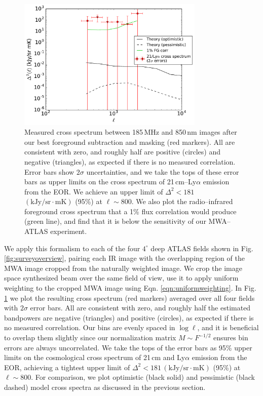 \documentclass[numberedappendix]{emulateapj}
\begin{document}
\begin{figure}[h]
\centering
\includegraphics[width=3.5in]{mwa_atlas_xspec_with_2Dsimtheory_and_2sigma_errors_6bins.pdf}
\caption[Measured cross spectrum between 185\,MHz and 850\,nm images after our best foreground subtraction and masking.]{Measured cross spectrum between 185\,MHz and 850\,nm images after our best foreground subtraction and masking (red markers). All are consistent with zero, and roughly half are positive (circles) and negative (triangles), as expected if there is no measured correlation. Error bars show $2\sigma$ uncertainties, and we take the tops of these error bars as upper limits on the cross spectrum of 21\,cm--Ly$\alpha$ emission from the EOR. We achieve an upper limit of $\Delta^2<181$\,$(\text{kJy/sr}\cdot \text{mK})$ (95\%) at $\ell\sim800$. We also plot the radio--infrared foreground cross spectrum that a 1\% flux correlation would produce (green line), and find that it is below the sensitivity of our MWA--ATLAS experiment.}
\label{fig:resxspec}
\end{figure}

We apply this formalism to each of the four $4^\circ$ deep ATLAS fields shown in Fig. \ref{fig:surveyoverview}, pairing each IR image with the overlapping region of the MWA image cropped from the naturally weighted image. We crop the image space synthesized beam over the same field of view, use it to apply uniform weighting to the cropped MWA image using Eqn. \ref{eqn:uniformweighting}. In Fig. \ref{fig:resxspec} we plot the resulting cross spectrum (red markers) averaged over all four fields with $2\sigma$ error bars. All are consistent with zero, and roughly half the estimated bandpowers are negative (triangles) and positive (circles), as expected if there is no measured correlation. Our bins are evenly spaced in $\log \ell$, and it is beneficial to overlap them slightly since our normalization matrix $M\sim F^{-1/2}$ ensures bin errors are always uncorrelated. We take the tops of the error bars as 95\% upper limits on the cosmological cross spectrum of 21\,cm and Ly$\alpha$ emission from the EOR, achieving a tightest upper limit of $\Delta^2<181$\,$(\text{kJy/sr}\cdot \text{mK})$ (95\%) at $\ell\sim800$. For comparison, we plot optimistic (black solid) and pessimistic (black dashed) model cross spectra as discussed in the previous section.
 
\end{document}
